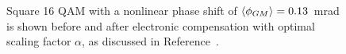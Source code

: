 \begin{figure}[H]
  \centering
  \qquad
  \caption{Square 16 QAM with a  nonlinear phase shift of $\braket{\phi_{GM}}= 0.13$~mrad is shown before and after electronic compensation with optimal scaling factor $\alpha$, as discussed in Reference~\cite{NLPNDSP}.}                                                                                                                                                                                                                                                                                                                                                                                                                                                                                                                                                                                                                                                                                                                                                                                                                                                                                                                                                                                                                                                                                                                                                                                                                                                                                                                                                                                                                                                                                                                                                                                                                                                                                                                                                                                                                                                                                                                                                                                                                                                                                                                                                                                                                                                                                                                                                                                                                                                                                                                                                                                                                                                                                                                                                                                                                                                                                                        
\end{figure}
